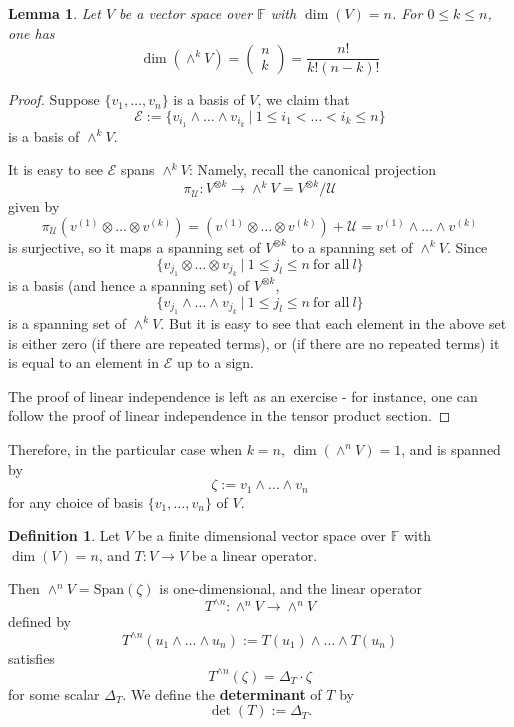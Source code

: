 \documentclass[11pt,openany]{book}
\theoremstyle{plain}
\newtheorem{lemma}[lemma]{Lemma}
\theoremstyle{definition}
\newtheorem{definition}[definition]{Definition}
\theoremstyle{remark}
\begin{document}
\begin{lemma}
Let $V$ be a vector space over $\mathbb{F}$ with $\dim(V) = n$. For $0 \leq k \leq n$, one has
$$\dim(\wedge^k V) = \begin{pmatrix} n \\ k\end{pmatrix} = \frac{n!}{k!(n-k)!}$$
\end{lemma}
\begin{proof}
    
    
    
    Suppose $\{v_1 , \dots, v_n\}$ is a basis of $V$, we claim that 
    $$\mathcal{E} := \{v_{i_1} \wedge \dots \wedge v_{i_k}\ |\ 1 \leq i_1 < \dots < i_k \leq n\}$$
    is a basis of $\wedge^k V$.

    It is easy to see $\mathcal{E}$ spans $\wedge^k V$: Namely, recall the canonical projection
    $$\pi_{\mathcal{U}}: V^{\otimes k} \to \wedge^k V = V^{\otimes k}/\mathcal{U}$$
    given by 
    $$\pi_{\mathcal{U}}(v^{(1)} \otimes \dots \otimes v^{(k)}) = (v^{(1)} \otimes \dots \otimes v^{(k)}) + \mathcal{U} = v^{(1)} \wedge \dots \wedge v^{(k)}$$
    is surjective, so it maps a spanning set of $V^{\otimes k}$ to a spanning set of $\wedge^k V$. Since 
    $$\{v_{j_1} \otimes \dots \otimes v_{j_k}\ |\ 1 \leq j_{l} \leq n\ \text{for all}\ l\}$$
    is a basis (and hence a spanning set) of $V^{\otimes k}$, 
    $$\{v_{j_1} \wedge \dots \wedge v_{j_k}\ |\ 1 \leq j_{l} \leq n\ \text{for all}\ l\}$$
    is a spanning set of $\wedge^k V$. But it is easy to see that each element in the above set is either zero (if there are repeated terms), or (if there are no repeated terms) it is equal to an element in $\mathcal{E}$ up to a sign.

    The proof of linear independence is left as an exercise - for instance, one can follow the proof of linear independence in the tensor product section.
\end{proof}
Therefore, in the particular case when $k = n$, $\dim(\wedge^n V) = 1$, and is spanned by 
$$\zeta:= v_1 \wedge \dots \wedge v_n$$ 
for any choice of basis $\{v_1, \dots, v_n\}$ of $V$.

\begin{definition}
    Let $V$ be a finite dimensional vector space over $\mathbb{F}$ with $\dim(V) = n$, and $T:V \to V$ be a linear operator. 
    
    Then $\wedge^n V = \mathrm{Span}(\zeta)$ is one-dimensional, and the linear operator
    $$T^{\wedge n}: \wedge^n V \to \wedge^n V$$
    defined by
    $$T^{\wedge n}(u_1 \wedge \dots \wedge u_n) := T(u_1) \wedge \dots \wedge T(u_n)$$ satisfies
    $$T^{\wedge n}(\zeta) = \Delta_T \cdot \zeta$$
    for some scalar $\Delta_T$. We define the {\bf determinant} of $T$ by
    $$\det(T) := \Delta_T.$$
\end{definition}
\end{document}
